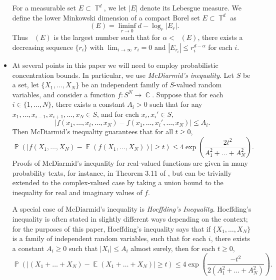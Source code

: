 \documentclass[dvipsnames,letterpaper,12pt]{article}
\numberwithin{equation}{section}
\DeclareMathOperator{\lowminkdim}{\underline{\dim}_{\mathbb{M}}}
\DeclareMathOperator{\TT}{\mathbb{T}}
\DeclareMathOperator{\CC}{\mathbb{C}}
\numberwithin{theorem}{section}
\DeclareMathOperator{\EE}{\mathbb{E}}
\DeclareMathOperator{\PP}{\mathbb{P}}
\begin{document}
\begin{itemize}
    For a measurable set $E \subset \TT^d$, we let $|E|$ denote its Lebesgue measure. We define the lower Minkowski dimension of a compact Borel set $E \subset \TT^d$ as
    \[ \lowminkdim(E) = \liminf_{r \to 0} d - \log_r|E_r|. \]
    Thus $\lowminkdim(E)$ is the largest number such that for $\alpha < \lowminkdim(E)$, there exists a decreasing sequence $\{ r_i \}$ with $\lim_{i \to \infty} r_i = 0$ and $|E_{r_i}| \leq r_i^{d - \alpha}$ for each $i$.

    \item At several points in this paper we will need to employ probabilistic concentration bounds. In particular, we use \emph{McDiarmid's inequality}. Let $S$ be a set, let $\{ X_1, \dots, X_N \}$ be an independent family of $S$-valued random variables, and consider a function $f: S^N \to \CC$. Suppose that for each $i \in \{ 1, \dots, N \}$, there exists a constant $A_i > 0$ such that for any $x_1, \dots, x_{i-1}, x_{i+1}, \dots, x_N \in S$, and for each $x_i, x_i' \in S$,
    \[ |f(x_1, \dots, x_i, \dots, x_N) - f(x_1, \dots, x_i', \dots, x_N)| \leq A_i. \]
    Then McDiarmid's inequality guarantees that for all $t \geq 0$,
    \[ \PP \left( |f(X_1, \dots, X_N) - \EE(f(X_1, \dots, X_N))| \geq t \right) \leq 4 \exp \left( \frac{-2t^2}{A_1^2 + \dots + A_N^2} \right). \]
    Proofs of McDiarmid's inequality for real-valued functions are given in many probability texts, for instance, in Theorem 3.11 of \cite{VanHandel}, but can be trivially extended to the complex-valued case by taking a union bound to the inequality for real and imaginary values of $f$.

    A special case of McDiarmid's inequality is \emph{Hoeffding's Inequality}. Hoeffding's inequality is often stated in slightly different ways depending on the context; for the purposes of this paper, Hoeffding's inequality says that if $\{ X_1, \dots, X_N \}$ is a family of independent random variables, such that for each $i$, there exists a constant $A_i \geq 0$ such that $|X_i| \leq A_i$ almost surely, then for each $t \geq 0$,
    \[ \PP \left( |(X_1 + \dots + X_N) - \EE(X_1 + \dots + X_N)| \geq t \right) \leq 4 \exp \left(\frac{-t^2}{2(A_1^2 + \dots + A_N^2)} \right). \]

    \begin{comment}


\end{comment}
\end{itemize}
\end{document}
